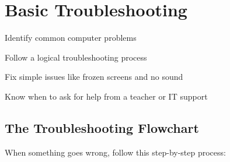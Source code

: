 
\chapter{Basic Troubleshooting}
\label{ch:troubleshoot}

\begin{objectives}
  \item Identify common computer problems
  \item Follow a logical troubleshooting process
  \item Fix simple issues like frozen screens and no sound
  \item Know when to ask for help from a teacher or IT support
\end{objectives}


\section{The Troubleshooting Flowchart}
\label{sec:troubleshoot-flow}

When something goes wrong, follow this step-by-step process:

